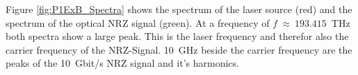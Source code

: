 Figure \ref{fig:P1ExB_Spectra} shows the spectrum of the laser source (red) and the spectrum of the optical NRZ signal (green). At a frequency of $f~\approx~193.415$~THz both spectra show a large peak. This is the laser frequency and therefor also the carrier frequency of the NRZ-Signal. 10~GHz beside the carrier frequency are the peaks of the 10~Gbit/s NRZ signal and it's harmonics. 

\begin{figure}%
\centering

\end{figure}

